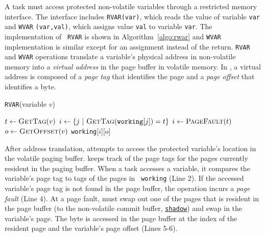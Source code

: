 A \sys task must access protected non-volatile variables through a restricted memory
interface. The interface includes \texttt{RVAR(var)}, which reads the value of
variable {\tt var} and \texttt{WVAR} \texttt{(var,val)}, which assigns
value {\tt val} to variable {\tt var}. The implementation of {\tt
RVAR} is shown in Algorithm~\ref{algo:rwar} and {\tt WVAR} implementation is
similar except for an assignment instead of the return.
%
{\tt RVAR} and {\tt WVAR} operations translate a variable's physical address in non-volatile memory into a \emph{virtual address} in the page buffer in volatile memory.  In \sys, a virtual address is composed of a \emph{page tag} that identifies the page and a \emph{page offset} that identifies a byte.


\begin{algorithm}
	\caption{\texttt{RVAR}(variable $v$)}
	\label{algo:rwar}
	\scriptsize
	\begin{algorithmic}[1]
		\State $t \leftarrow \Call{GetTag}{v}$ 
        \State $i \gets \{ j\ |\ \Call{GetTag}{\texttt{working}[j]} = t \}$ 
		 
		\State	$i \gets \Call{PageFault}{t}$ 
		\EndIf
		\State $o \leftarrow \Call{GetOffset}{v}$ 		
		\State \Return \texttt{working}[$i$][$o$]  
	\end{algorithmic}
\end{algorithm}

After address translation, \sys attempts to access the protected variable's
location in the volatile paging buffer. \sys keeps track of the page tags for
the pages currently resident in the paging buffer. When a task accesses a
variable, it compares the variable's page tag to tags of the pages in {\tt
working} (Line 2).
%
%
If the accessed variable's page tag is not found in the page buffer, the
operation incurs a {\em page fault} (Line 4). At a page fault, \sys must swap
out one of the pages that is resident in the page buffer (to the non-volatile
commit buffer, \texttt{\underline{shadow}}) and swap in the variable's page.
%
The byte is accessed in the page buffer at the index of the resident page and
the variable's page offset (Lines 5-6).

